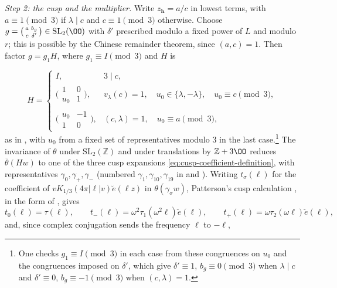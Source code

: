 \emph{Step 2: the cusp and the multiplier.} Write $z_{\boldsymbol h}=a/c$ in lowest terms,
with $a\equiv1\pmod3$ if $\lambda\mid c$ and $c\equiv1\pmod3$ otherwise. Choose
$g=\bigl(\begin{smallmatrix}a&b_g\\c&\delta'\end{smallmatrix}\bigr)\in\mathrm{SL}_2(\OO)$ with
$\delta'$ prescribed modulo a fixed power of $L$ and modulo $r$; this is possible by the Chinese
remainder theorem, since $(a,c)=1$. Then factor $g=g_1H$, where $g_1\equiv I\pmod3$ and $H$ is

\[
 H=
 \begin{cases}
  I,&3\mid c,\\
  \bigl(\begin{smallmatrix}1&0\\u_0&1\end{smallmatrix}\bigr),
     &v_\lambda(c)=1,\quad u_0\in\{\lambda,-\lambda\},\quad u_0\equiv c\pmod3,\\
  \bigl(\begin{smallmatrix}u_0&-1\\1&0\end{smallmatrix}\bigr),
     &(c,\lambda)=1,\quad u_0\equiv a\pmod3,
 \end{cases}
\]
as in \cite[\S5.1]{DR}, with $u_0$ from a fixed set of representatives modulo $3$ in the last
case.\footnote{One checks $g_1\equiv I\pmod3$ in each case from these congruences on $u_0$ and the
congruences imposed on $\delta'$, which give $\delta'\equiv1$, $b_g\equiv0\pmod3$ when
$\lambda\mid c$ and $\delta'\equiv0$, $b_g\equiv-1\pmod3$ when $(c,\lambda)=1$.} The
invariance of $\theta$ under $\mathrm{SL}_2(\mathbb Z)$ and under translations by $\mathbb Z+3\OO$
reduces $\overline\theta(Hw)$ to one of the three cusp expansions
\eqref{eq:cusp-coefficient-definition}, with representatives $\gamma_0,\gamma_+,\gamma_-$
(numbered $\gamma_1,\gamma_{10},\gamma_{19}$ in \cite[\S5.1]{DR} and \cite[Table~II]{Pat77}).
Writing $t_\sigma(\ell)$ for the coefficient of $vK_{1/3}(4\pi|\ell|v)\breve e(\ell z)$ in
$\theta(\gamma_\sigma w)$, Patterson's cusp calculation \cite[Theorem~8.1 and Table~III]{Pat77},
in the form of \cite[(5.13), (5.14)]{DR}, gives
\begin{equation}\label{eq:cusp-fourier-coefficients}
 t_0(\ell)=\tau(\ell),\qquad
 t_-(\ell)=\omega^2\tau_1(\omega^2\ell)\breve e(\ell),
 \qquad
 t_+(\ell)=\omega\tau_2(\omega\ell)\breve e(\ell),
\end{equation}
and, since complex conjugation sends the frequency $\ell$ to $-\ell$,
